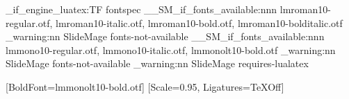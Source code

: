 \sys_if_engine_luatex:TF
  {
      {  { fontspec } }
      { \RequirePackage [ no-math ] { fontspec } }
    \__SM_if_fonts_available:nnn
      { lmroman10-regular.otf, lmroman10-italic.otf, lmroman10-bold.otf, lmroman10-bolditalic.otf }
      {
        \setsansfont
          [
            ItalicFont = { lmroman10-italic.otf },
            BoldFont = { lmroman10-bold.otf },
            BoldItalicFont = { lmroman10-bolditalic.otf }
          ]
          { lmroman10-regular.otf }
        \setmainfont
          [
            ItalicFont = { lmroman10-italic.otf },
            BoldFont = { lmroman10-bold.otf },
            BoldItalicFont = { lmroman10-bolditalic.otf }
          ]
          { lmroman10-regular.otf }
        \renewcommand { \ttdefault } { lmtt }
      }
      { \msg_warning:nn { SlideMage } { fonts-not-available } }
    \__SM_if_fonts_available:nnn
      { lmmono10-regular.otf, lmmono10-italic.otf, lmmonolt10-bold.otf }
      {
        \setmonofont
          [
            ItalicFont = { lmmono10-italic.otf },
            BoldFont = { lmmonolt10-bold.otf }
          ]
          { lmmono10-regular.otf }
      }
      { \msg_warning:nn { SlideMage } { fonts-not-available } }
  }
  { \msg_warning:nn { SlideMage } { requires-lualatex } }

\makeatother
\ExplSyntaxOff

\newcommand{\SMFontAscender}{0.806}
\newcommand{\SMLinespread}{1.15}
\newcommand{\SMParskip}{0.5em}

\newfontfamily{}[BoldFont=lmmonolt10-bold.otf]
\newfontfamily{}[Scale=0.95, Ligatures=TeXOff]
\newcommand{\SMCardHeadingFont}{\bfseries}

\let\SMOrigText\text
\renewcommand{\text}[1]{\SMOrigText{\usefont{OT1}{cmr}{m}{n}#1}}
